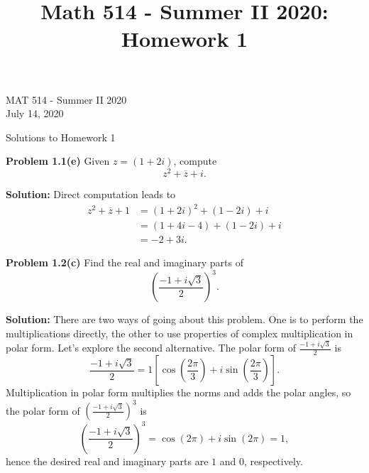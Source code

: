 \documentclass[12pt,oneside]{exam}
\title{Math 514 - Summer II 2020: Homework 1}
\newenvironment{exercise}[1]{\vspace{.1in}\noindent\textbf{Problem #1 \hspace{.05em}}}{}
\begin{document}
\begin{flushright}
\sc MAT 514 - Summer II 2020\\
July 14, 2020
\end{flushright}
\bigskip
 
\begin{center}
\textsf{Solutions to Homework 1} 
\end{center}


\begin{exercise}{1.1(e)}
 Given $z = (1+2i)$, compute 
\begin{equation*}
z^2+\overline{z}+i.
\end{equation*}
\end{exercise}

\noindent \textbf{Solution:} Direct computation leads to 
\begin{align*}
z^2 + \overline{z}+1 & = (1+2i)^2+(1-2i) + i \\
& = (1+4i-4) +(1-2i) + i\\
& = -2+3i.
\end{align*}

\vspace{1cm}

\begin{exercise}{1.2(c)}
Find the real and imaginary parts of 
\begin{equation*}
\left(\frac{-1+i\sqrt{3}}{2}\right)^3.
\end{equation*}
\end{exercise}


\noindent \textbf{Solution:} There are two ways of going about this problem. One is to perform the multiplications directly, the other to use properties of complex multiplication in polar form. Let's explore the second alternative. The polar form of $\frac{-1+i\sqrt{3}}{2}$ is 
\begin{equation*}
\frac{-1+i\sqrt{3}}{2} = 1\left[\cos\left( \frac{2\pi}{3} \right) + i \sin\left( \frac{2\pi}{3} \right)\right].
\end{equation*}
Multiplication in polar form multiplies the norms and adds the polar angles, so the polar form of $\left(\frac{-1+i\sqrt{3}}{2}\right)^3$ is 
\begin{equation*}
\left(\frac{-1+i\sqrt{3}}{2}\right)^3=  \cos(2\pi) + i\sin(2\pi) = 1, 
\end{equation*}
hence the desired real and imaginary parts are $1$ and $0$, respectively. 
\end{document}
